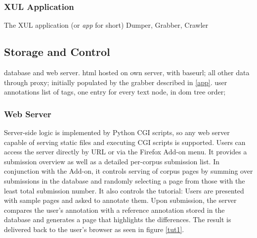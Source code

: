 \subsubsection{XUL Application \label{app}}

The XUL application (or \textit{app} for short) 
Dumper, Grabber, Crawler


\subsection{Storage and Control}


database and web server. 
html hosted on own server, with baseurl; all other data through proxy; initially populated by the grabber described in \ref{app}.
user annotations list of tags, one entry for every text node, in dom tree order;


\subsubsection{Web Server}

Server-side logic is implemented by Python CGI scripts, so any web server capable of serving static files and executing CGI scripts is supported.
Users can access the server directly by URL or via the Firefox Add-on menu.
It provides a submission overview as well as a detailed per-corpus submission list.
In conjunction with the Add-on, it controls serving of corpus pages by summing over submissions in the database and randomly selecting a page from those with the least total submission number.
It also controls the tutorial: Users are presented with sample pages and asked to annotate them.
Upon submission, the server compares the user's annotation with a reference annotation stored in the database and generates a page that highlights the differences.
The result is delivered back to the user's browser as seen in figure \ref{tut1}.

